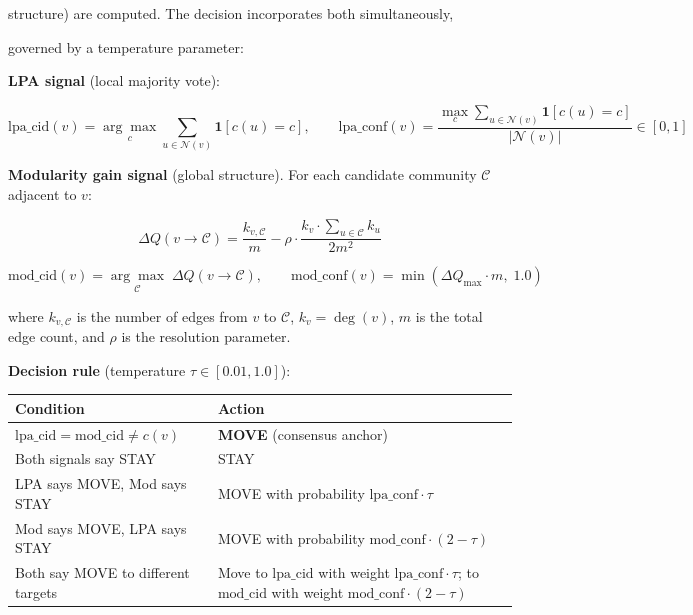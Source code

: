 \documentclass[10pt,journal,compsoc]{IEEEtran}
\begin{document}
structure) are computed. The decision incor\-porates both simul\-taneously,

governed by a temperature parameter:

\textbf{LPA signal} (local majority vote):

\begin{equation}
\mathrm{lpa\_cid}(v) = \underset{c}{\arg\max}\sum_{u \in \mathcal{N}(v)} \mathbf{1}[c(u) = c], \qquad \mathrm{lpa\_conf}(v) = \frac{\max_c \sum_{u \in \mathcal{N}(v)} \mathbf{1}[c(u)=c]}{|\mathcal{N}(v)|} \in [0,1]
\end{equation}

\textbf{Modularity gain signal} (global structure). For each candidate community $\mathcal{C}$ adjacent to $v$:

\begin{equation}
\Delta Q(v \to \mathcal{C}) = \frac{k_{v,\mathcal{C}}}{m} - \rho \cdot \frac{k_v \cdot \sum_{u \in \mathcal{C}} k_u}{2m^2}
\end{equation}

\begin{equation}
\mathrm{mod\_cid}(v) = \underset{\mathcal{C}}{\arg\max}\;\Delta Q(v \to \mathcal{C}), \qquad \mathrm{mod\_conf}(v) = \min\!\left(\Delta Q_{\max} \cdot m,\; 1.0\right)
\end{equation}

where $k_{v,\mathcal{C}}$ is the number of edges from $v$ to $\mathcal{C}$, $k_v = \deg(v)$, $m$ is the total edge count, and $\rho$ is the resolution parameter.

\textbf{Decision rule} (temperature $\tau \in [0.01, 1.0]$):

\begin{center}
\begin{tabularx}{\columnwidth}{|>{\raggedright\arraybackslash}X|>{\raggedright\arraybackslash}X|}
\hline
Condition & Action \\ \hline
$\mathrm{lpa\_cid} = \mathrm{mod\_cid} \neq c(v)$ & \textbf{MOVE} (consensus anchor) \\ \hline
Both signals say STAY & STAY \\ \hline
LPA says MOVE, Mod says STAY & MOVE with probability $\mathrm{lpa\_conf} \cdot \tau$ \\ \hline
Mod says MOVE, LPA says STAY & MOVE with probability $\mathrm{mod\_conf} \cdot (2 - \tau)$ \\ \hline
Both say MOVE to different targets & Move to $\mathrm{lpa\_cid}$ with weight $\mathrm{lpa\_conf} \cdot \tau$; to $\mathrm{mod\_cid}$ with weight $\mathrm{mod\_conf} \cdot (2 - \tau)$ \\ \hline
\end{tabularx}
\end{center}
\end{document}
